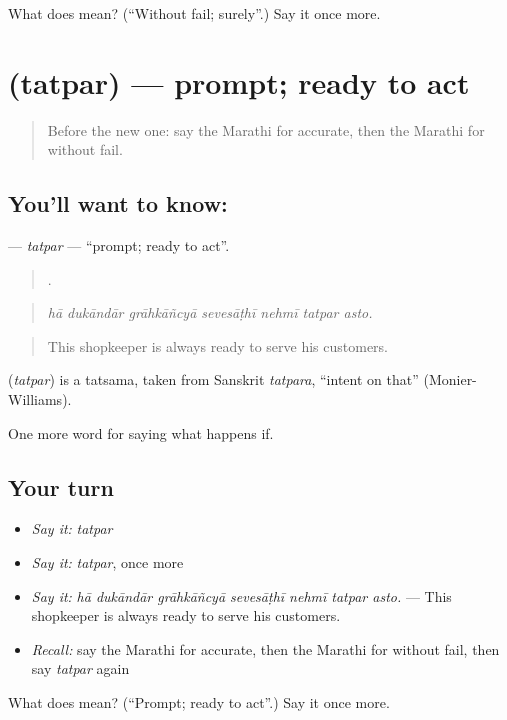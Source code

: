 \begin{tcolorbox}[breakable,colback=teal!4,colframe=teal!35!black,title={Before you move on}]
What does  mean? (\textquotedblleft{}Without fail; surely\textquotedblright{}.) Say it once more.
\end{tcolorbox}
\section[\texorpdfstring{\mr{तत्पर} (tatpar)}{तत्पर (tatpar)}]{ (tatpar) — prompt; ready to act}

\label{lesson:MR-C553-tatpar}



\begin{quote}
Before the new one: say the Marathi for accurate, then the Marathi for without fail.
\end{quote}

\subsection*{You'll want to know: }
\textbf{} — \emph{tatpar} — \textquotedblleft{}prompt; ready to act\textquotedblright{}.

\begin{quote}
      .
\end{quote}

\begin{quote}
\emph{hā dukāndār grāhkāñcyā sevesāṭhī nehmī tatpar asto.}
\end{quote}

\begin{quote}
This shopkeeper is always ready to serve his customers.
\end{quote}

\begin{cousinweb}
\textbf{} (\emph{tatpar}) is a tatsama, taken from Sanskrit \emph{tatpara}, \textquotedblleft{}intent on that\textquotedblright{} (Monier-Williams).
\end{cousinweb}

\begin{grammarlens}[title={What you've built}]
One more word for saying what happens if.
\end{grammarlens}

\subsection*{Your turn}
\begin{itemize}
\raggedright
  \item \emph{Say it:} \emph{tatpar}
  \item \emph{Say it:} \emph{tatpar}, once more
  \item \emph{Say it:} \emph{hā dukāndār grāhkāñcyā sevesāṭhī nehmī tatpar asto.} — This shopkeeper is always ready to serve his customers.
  \item \emph{Recall:} say the Marathi for accurate, then the Marathi for without fail, then say \emph{tatpar} again
\end{itemize}

\begin{tcolorbox}[breakable,colback=teal!4,colframe=teal!35!black,title={Before you move on}]
What does  mean? (\textquotedblleft{}Prompt; ready to act\textquotedblright{}.) Say it once more.
\end{tcolorbox}
